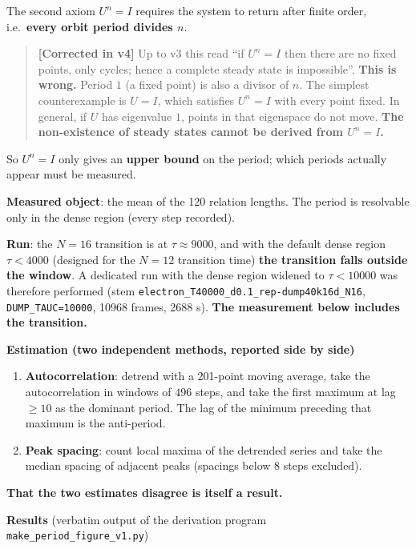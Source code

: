 \documentclass[
  10pt,
]{article}
\providecommand{\tightlist}{%
  \setlength{\itemsep}{0pt}\setlength{\parskip}{0pt}}
\begin{document}
The second axiom \(U^n = I\) requires the system to return after finite
order, i.e.~\textbf{every orbit period divides \(n\)}.

\begin{quote}
\textbf{{[}Corrected in v4{]}} Up to v3 this read ``if \(U^n=I\) then
there are no fixed points, only cycles; hence a complete steady state is
impossible''. \textbf{This is wrong.} Period \(1\) (a fixed point) is
also a divisor of \(n\). The simplest counterexample is \(U=I\), which
satisfies \(U^n=I\) with every point fixed. In general, if \(U\) has
eigenvalue \(1\), points in that eigenspace do not move. \textbf{The
non-existence of steady states cannot be derived from \(U^n=I\).}
\end{quote}

So \(U^n=I\) only gives an \textbf{upper bound} on the period; which
periods actually appear must be measured.

\textbf{Measured object}: the mean of the 120 relation lengths. The
period is resolvable only in the dense region (every step recorded).

\textbf{Run}: the \(N=16\) transition is at \(\tau\approx9000\), and
with the default dense region \(\tau<4000\) (designed for the \(N=12\)
transition time) \textbf{the transition falls outside the window}. A
dedicated run with the dense region widened to \(\tau<10000\) was
therefore performed (stem
\texttt{electron\_T40000\_d0.1\_rep-dump40k16d\_N16},
\texttt{DUMP\_TAUC=10000}, 10968 frames, 2688 s). \textbf{The
measurement below includes the transition.}

\textbf{Estimation (two independent methods, reported side by side)}

\begin{enumerate}
\def\labelenumi{\arabic{enumi}.}
\tightlist
\item
  \textbf{Autocorrelation}: detrend with a 201-point moving average,
  take the autocorrelation in windows of \(496\) steps, and take the
  first maximum at lag \(\ge10\) as the dominant period. The lag of the
  minimum preceding that maximum is the anti-period.
\item
  \textbf{Peak spacing}: count local maxima of the detrended series and
  take the median spacing of adjacent peaks (spacings below \(8\) steps
  excluded).
\end{enumerate}

\textbf{That the two estimates disagree is itself a result.}

\textbf{Results} (verbatim output of the derivation program
\texttt{make\_period\_figure\_v1.py})
\end{document}
